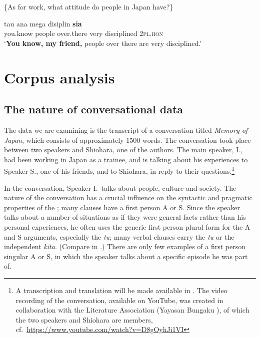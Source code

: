 \documentclass[output=paper
,modfonts
,nonflat]{langsci/langscibook}
\begin{document}
\begin{exe}
	\ex\label{nai1}
	\begin{xlist}
		 \{As for work, what attitude do people in Japan have?\}
	\end{xlist}
	\begin{xlist}[> A\textsubscript{{19.1}}:]
		\exi{> A\textsubscript{{19.1}}:}
		 {{\ob}tau} {{\ob}ana{\cb}\ctopic} {{\ob}mega} {disiplin{\cb}\focus{\cb}\sq} {{\ob}\textbf{sia}{\cb}\nai}\\
		you.know people over.there very disciplined \textsc{2pl.hon}\\
		\glt `\textbf{You know, my friend,} people over there are very disciplined.'
	\end{xlist}
\end{exe}


\section{Corpus analysis}\label{sect:corpusAnalysis}

\subsection{The nature of conversational data}

The data we are examining is the transcript of a  conversation titled \textit{Memory of Japan}, which consists of approximately 1500 words. The conversation took place between two  speakers and Shiohara, one of the authors. The main speaker, I., had been working in Japan as a trainee, and is talking about his experiences to Speaker S., one of his friends, and to Shiohara, in reply to their questions.\footnote{A transcription and translation will be made available in \citet{shiasta}. The video recording of the conversation, available on YouTube, was created in collaboration with the  Literature Association (Yayasan Bungaku ), of which the two speakers and Shiohara are members, cf.\ \url{https://www.youtube.com/watch?v=D8gOyhJi1VI}} 

In the conversation, Speaker I.\ talks about  people, culture and society. The nature of the conversation has a crucial influence on the syntactic and pragmatic properties of the ; many clauses have a first person A or S. Since the speaker talks about a number of situations as if they were general facts rather than his personal experiences, he often uses the generic first person plural form for the A and S arguments, especially the  \textit{tu}; many 
verbal clauses carry the  \textit{tu} or the independent  \textit{kita}. (Compare  in .) There are only few
examples of a first person singular A or S, in which the speaker talks about a specific episode he was part of.
\end{document}
